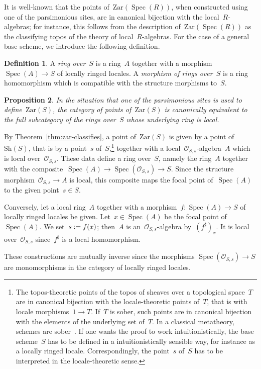 \documentclass[10pt,reqno,a4paper]{amsbook}
\makeatletter
\theoremstyle{definition}
\newtheorem{defn}{Definition}[section]
\theoremstyle{plain}
\newtheorem{prop}[defn]{Proposition}
\theoremstyle{remark}
\renewcommand{\O}{\mathcal{O}}
\newcommand{\Sh}{\mathrm{Sh}}
\newcommand{\Zar}{\mathrm{Zar}}
\DeclareMathOperator{\Spec}{Spec}
\newcommand{\?}{\,{:}\,}
\renewcommand{\_}{\mathpunct{.}\,}
\newcommand{\stacksproject}[1]{\cite[{\href{https://stacks.math.columbia.edu/tag/#1}{Tag~#1}}]{stacks-project}}
\newcommand{\defeq}{\vcentcolon=}
\renewenvironment{proof}[1][\proofname]{\par
  \pushQED{\qed}%
  \normalfont \topsep6\p@\@plus6\p@\relax
  \trivlist
  \item[\hskip\labelsep
        \itshape
    #1\@addpunct{.}]\ignorespaces
}{%
  \popQED\endtrivlist\@endpefalse
}
\makeatother
\begin{document}
It is well-known that the points of~$\Zar(\Spec(R))$, when constructed using
one of the parsimonious sites, are in canonical bijection with the
local~$R$-algebras; for instance, this follows from the description
of~$\Zar(\Spec(R))$ as the classifying topos of the theory of
local~$R$-algebras. For the case of a general base scheme, we introduce the
following definition.

\begin{defn}\label{defn:ring-over-s}A \emph{ring over~$S$} is a ring~$A$ together with a
morphism~$\Spec(A) \to S$ of locally ringed locales. A \emph{morphism of rings
over~$S$} is a ring homomorphism which is compatible with the structure
morphisms to~$S$.\end{defn}

\begin{prop}\label{prop:points-of-big-zariski}
In the situation that one of the parsimonious sites is used to
define~$\Zar(S)$, the category of points of~$\Zar(S)$ is canonically equivalent
to the full subcategory of the rings over~$S$ whose underlying ring is
local.\end{prop}

\begin{proof}By Theorem~\ref{thm:zar-classifies}, a point of~$\Zar(S)$ is given
by a point of~$\Sh(S)$, that is by a point~$s$ of~$S$,\footnote{The
topos-theoretic points of the topos of sheaves over a topological space~$T$ are
in canonical bijection with the locale-theoretic points of~$T$, that is with
locale morphisms~$1 \to T$. If~$T$ is sober, such points are in canonical
bijection with the elements of the underlying set of~$T$. In a classical
metatheory, schemes are sober~\stacksproject{01IS}. If one wants the proof to
work intuitionistically, the base scheme~$S$ has to be defined in a
intuitionistically sensible way, for instance as a locally ringed locale.
Correspondingly, the point~$s$ of~$S$ has to be interpreted in the
locale-theoretic sense.} together with a local~$\O_{S,s}$-algebra~$A$ which is
local over~$\O_{S,s}$. These data define a ring over~$S$, namely the ring~$A$
together with the composite~$\Spec(A) \to \Spec(\O_{S,s}) \to S$.
Since the structure morphism~$\O_{S,s} \to A$ is local, this composite maps the
focal point of~$\Spec(A)$ to the given point~$s \in S$.

Conversely, let a local ring~$A$ together with a morphism~$f : \Spec(A) \to S$ of
locally ringed locales be given. Let~$x \in \Spec(A)$ be the focal point
of~$\Spec(A)$. We set~$s \defeq f(x)$; then~$A$ is an~$\O_{S,s}$-algebra
by~$(f^\sharp)_x$. It is local over~$\O_{S,s}$ since~$f^\sharp$ is a local
homomorphism.

These constructions are mutually inverse since the morphisms $\Spec(\O_{S,s})
\to S$ are monomorphisms in the category of locally ringed locales.
\end{proof}
\end{document}
